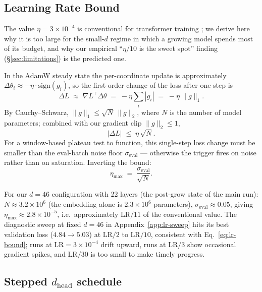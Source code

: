 \documentclass{article}
\begin{document}
\subsection{Learning Rate Bound}
\label{sec:lr-bound}

The value $\eta = 3{\times}10^{-4}$ is conventional for transformer training
\citep{adam}; we derive here why it is too large for the small-$d$ regime in
which a growing model spends most of its budget, and why our empirical
``$\eta/10$ is the sweet spot'' finding (\S\ref{sec:limitations}) is the
predicted one.

In the AdamW steady state the per-coordinate update is approximately
$\Delta\theta_i \approx -\eta\cdot\mathrm{sign}(g_i)$, so the first-order
change of the loss after one step is
\begin{equation}
\Delta L \;\approx\; \nabla L^{\!\top} \!\Delta\theta
            \;=\; -\eta \sum_i |g_i|
            \;=\; -\eta\,\|g\|_1.
\end{equation}
By Cauchy--Schwarz, $\|g\|_1 \le \sqrt{N}\,\|g\|_2$, where $N$ is the number
of model parameters; combined with our gradient clip $\|g\|_2 \le 1$,
\begin{equation}
|\Delta L| \;\le\; \eta\,\sqrt{N}.
\end{equation}
For a window-based plateau test to function, this single-step loss change
must be smaller than the eval-batch noise floor $\sigma_{\text{eval}}$ ---
otherwise the trigger fires on noise rather than on saturation.  Inverting
the bound:
\begin{equation}
\boxed{\;\eta_{\max} \;=\; \frac{\sigma_{\text{eval}}}{\sqrt{N}}.\;}
\label{eq:lr-bound}
\end{equation}

For our $d=46$ configuration with 22 layers (the post-grow state of the
main run): $N \approx 3.2\times 10^{6}$ (the embedding alone is $2.3{\times}
10^6$ parameters), $\sigma_{\text{eval}} \approx 0.05$, giving
$\eta_{\max} \approx 2.8 \times 10^{-5}$, i.e.\ approximately
$\mathrm{LR}/11$ of the conventional value.  The diagnostic sweep at fixed
$d=46$ in Appendix~\ref{app:lr-sweep} hits its best validation loss
($4.84{\to}5.03$) at $\mathrm{LR}/2$ to $\mathrm{LR}/10$, consistent with
Eq.~\ref{eq:lr-bound}; runs at $\mathrm{LR}=3{\times}10^{-4}$ drift upward,
runs at $\mathrm{LR}/3$ show occasional gradient spikes, and
$\mathrm{LR}/30$ is too small to make timely progress.

\subsection{Stepped $d_{\text{head}}$ schedule}
\label{sec:dhead}
\end{document}
